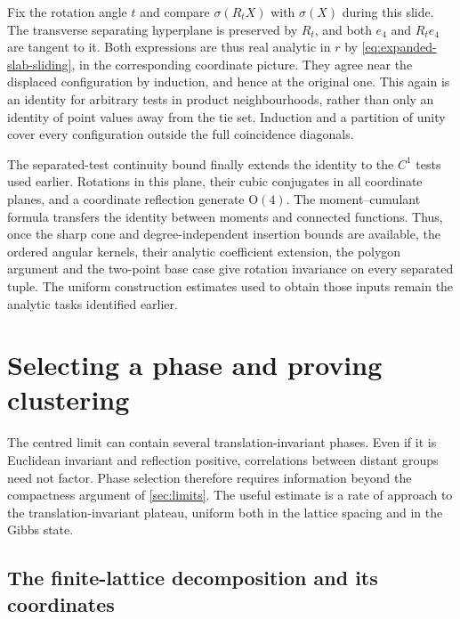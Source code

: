 \documentclass[11pt,letterpaper,reqno]{amsart}
\theoremstyle{definition}
\theoremstyle{remark}
\begin{document}
Fix the rotation angle $t$ and compare
$\sigma(R_tX)$ with $\sigma(X)$ during this slide. The transverse
separating hyperplane is preserved by $R_t$, and both $e_4$ and
$R_te_4$ are tangent to it. Both expressions are thus real analytic
in $r$ by \eqref{eq:expanded-slab-sliding}, in the corresponding
coordinate picture. They agree near the displaced configuration by
induction, and hence at the original one. This again is an identity
for arbitrary tests in product neighbourhoods, rather than only an
identity of point values away from the tie set. Induction and a
partition of unity cover every configuration outside the full
coincidence diagonals.

The separated-test continuity bound finally extends the identity to
the $C^1$ tests used earlier. Rotations in this plane, their cubic
conjugates in all coordinate planes, and a coordinate reflection
generate $\mathrm O(4)$. The moment--cumulant formula transfers the
identity between moments and connected functions. Thus, once the
sharp cone and degree-independent insertion bounds are available,
the ordered angular kernels, their analytic coefficient extension,
the polygon argument and the two-point base case give rotation
invariance on every separated tuple. The uniform construction
estimates used to obtain those inputs remain the analytic tasks
identified earlier.

\section{Selecting a phase and proving clustering}\label{sec:phases}

The centred limit can contain several translation-invariant phases.
Even if it is Euclidean invariant and reflection positive, correlations
between distant groups need not factor. Phase selection therefore
requires information beyond the compactness argument of
\cref{sec:limits}. The useful estimate is a rate of approach to the
translation-invariant plateau, uniform both in the lattice spacing
and in the Gibbs state.

\subsection{The finite-lattice decomposition and its coordinates}
\end{document}
